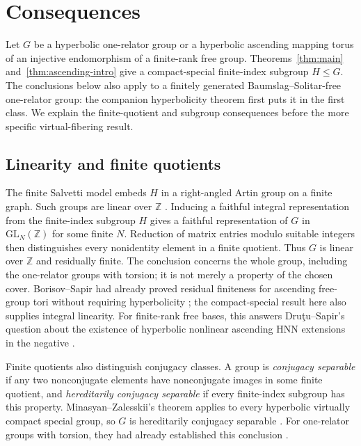 \section{Consequences}\label{sec:free-by-cyclic}

Let $G$ be a hyperbolic one-relator group or a hyperbolic ascending
mapping torus of an injective endomorphism of a finite-rank free group.
Theorems~\ref{thm:main} and~\ref{thm:ascending-intro} give a
compact-special finite-index subgroup $H\leq G$. The conclusions below
also apply to a finitely generated Baumslag--Solitar-free one-relator
group: the companion hyperbolicity theorem
\cite[Theorem~1.1]{OpenAIHyperbolicity} first puts it in the first class. We explain the finite-quotient and subgroup consequences before
the more specific virtual-fibering result.

\subsection{Linearity and finite quotients}

The finite Salvetti model embeds $H$ in a right-angled Artin group on a
finite graph. Such groups are linear over $\mathbb Z$
\cite{HaglundWise2008}. Inducing a faithful integral representation
from the finite-index subgroup $H$ gives a faithful representation of
$G$ in $\mathrm{GL}_N(\mathbb Z)$ for some finite $N$. Reduction of
matrix entries modulo suitable integers then distinguishes every
nonidentity element in a finite quotient. Thus $G$ is linear over
$\mathbb Z$ and residually finite. The conclusion concerns the whole
group, including the one-relator groups with torsion; it is not merely
a property of the chosen cover. Borisov--Sapir had already proved
residual finiteness for ascending free-group tori without requiring
hyperbolicity \cite{BorisovSapir2005}; the compact-special result here
also supplies integral linearity.
For finite-rank free bases, this answers Dru\c{t}u--Sapir's question
about the existence of hyperbolic nonlinear ascending HNN extensions
in the negative \cite[Problem~6]{DrutuSapir2005}.

Finite quotients also distinguish conjugacy classes. A group is
\emph{conjugacy separable} if any two nonconjugate elements have
nonconjugate images in some finite quotient, and \emph{hereditarily
conjugacy separable} if every finite-index subgroup has this property.
Minasyan--Zalesskii's theorem applies to every hyperbolic virtually
compact special group, so $G$ is hereditarily conjugacy separable
\cite[Theorem~1.1]{MinasyanZalesskii2016}. For one-relator groups with
torsion, they had already established this conclusion
\cite[Theorem~1.1]{MinasyanZalesskii2013}.

